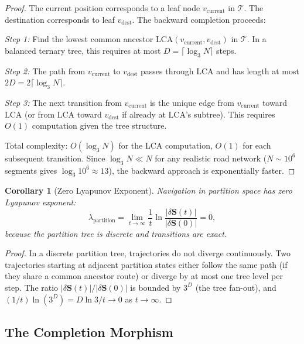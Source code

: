 \documentclass[twocolumn,10pt]{article}
\newtheorem{corollary}[theorem]{Corollary}
\theoremstyle{definition}
\theoremstyle{remark}
\begin{document}
\begin{proof}
The current position corresponds to a leaf node $v_{\mathrm{current}}$ in $\mathcal{T}$. The destination corresponds to leaf $v_{\mathrm{dest}}$. The backward completion proceeds:

\emph{Step 1:} Find the lowest common ancestor $\mathrm{LCA}(v_{\mathrm{current}}, v_{\mathrm{dest}})$ in $\mathcal{T}$. In a balanced ternary tree, this requires at most $D = \lceil\log_3 N\rceil$ steps.

\emph{Step 2:} The path from $v_{\mathrm{current}}$ to $v_{\mathrm{dest}}$ passes through $\mathrm{LCA}$ and has length at most $2D = 2\lceil\log_3 N\rceil$.

\emph{Step 3:} The next transition from $v_{\mathrm{current}}$ is the unique edge from $v_{\mathrm{current}}$ toward $\mathrm{LCA}$ (or from $\mathrm{LCA}$ toward $v_{\mathrm{dest}}$ if already at $\mathrm{LCA}$'s subtree). This requires $O(1)$ computation given the tree structure.

Total complexity: $O(\log_3 N)$ for the LCA computation, $O(1)$ for each subsequent transition. Since $\log_3 N \ll N$ for any realistic road network ($N \sim 10^6$ segments gives $\log_3 10^6 \approx 13$), the backward approach is exponentially faster.
\end{proof}

\begin{corollary}[Zero Lyapunov Exponent]
\label{cor:zero_lyapunov}
Navigation in partition space has zero Lyapunov exponent:
\begin{equation}
  \lambda_{\mathrm{partition}} = \lim_{t \to \infty} \frac{1}{t} \ln\!\frac{|\delta\mathbf{S}(t)|}{|\delta\mathbf{S}(0)|} = 0,
  \label{eq:zero_lyapunov}
\end{equation}
because the partition tree is discrete and transitions are exact.
\end{corollary}

\begin{proof}
In a discrete partition tree, trajectories do not diverge continuously. Two trajectories starting at adjacent partition states either follow the same path (if they share a common ancestor route) or diverge by at most one tree level per step. The ratio $|\delta\mathbf{S}(t)|/|\delta\mathbf{S}(0)|$ is bounded by $3^D$ (the tree fan-out), and $(1/t)\ln(3^D) = D\ln 3/t \to 0$ as $t \to \infty$.
\end{proof}

\subsection{The Completion Morphism}
\end{document}

